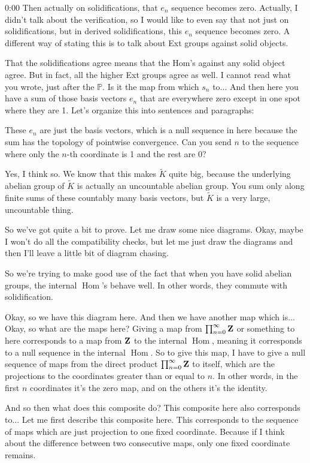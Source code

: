 \begin{unfinished}{0:00}
Then actually on solidifications, that $e_n$ sequence becomes zero. Actually, I didn't talk about the verification, so I would like to even say that not just on solidifications, but in derived solidifications, this $e_n$ sequence becomes zero. A different way of stating this is to talk about Ext groups against solid objects.

That the solidifications agree means that the $\text{Hom}$'s against any solid object agree. But in fact, all the higher Ext groups agree as well. I cannot read what you wrote, just after the $\mathbb{P}$. Is it the map from which $s_n$ to... And then here you have a sum of those basis vectors $e_n$ that are everywhere zero except in one spot where they are 1.
Let's organize this into sentences and paragraphs:

These $e_n$ are just the basis vectors, which is a null sequence in here because the sum has the topology of pointwise convergence. Can you send $n$ to the sequence where only the $n$-th coordinate is 1 and the rest are 0?

Yes, I think so. We know that this makes $\tilde{K}$ quite big, because the underlying abelian group of $\tilde{K}$ is actually an uncountable abelian group. You sum only along finite sums of these countably many basis vectors, but $\tilde{K}$ is a very large, uncountable thing.

So we've got quite a bit to prove. Let me draw some nice diagrams. Okay, maybe I won't do all the compatibility checks, but let me just draw the diagrams and then I'll leave a little bit of diagram chasing.

So we're trying to make good use of the fact that when you have solid abelian groups, the internal $\operatorname{Hom}$'s behave well. In other words, they commute with solidification.

Okay, so we have this diagram here. And then we have another map which is... Okay, so what are the maps here? Giving a map from $\prod_{n=0}^\infty \mathbf Z$ or something to here corresponds to a map from $\mathbf Z$ to the internal $\operatorname{Hom}$, meaning it corresponds to a null sequence in the internal $\operatorname{Hom}$. So to give this map, I have to give a null sequence of maps from the direct product $\prod_{n=0}^\infty \mathbf Z$ to itself, which are the projections to the coordinates greater than or equal to $n$. In other words, in the first $n$ coordinates it's the zero map, and on the others it's the identity.

And so then what does this composite do? This composite here also corresponds to... Let me first describe this composite here. This corresponds to the sequence of maps which are just projection to one fixed coordinate. Because if I think about the difference between two consecutive maps, only one fixed coordinate remains.


\end{unfinished}
